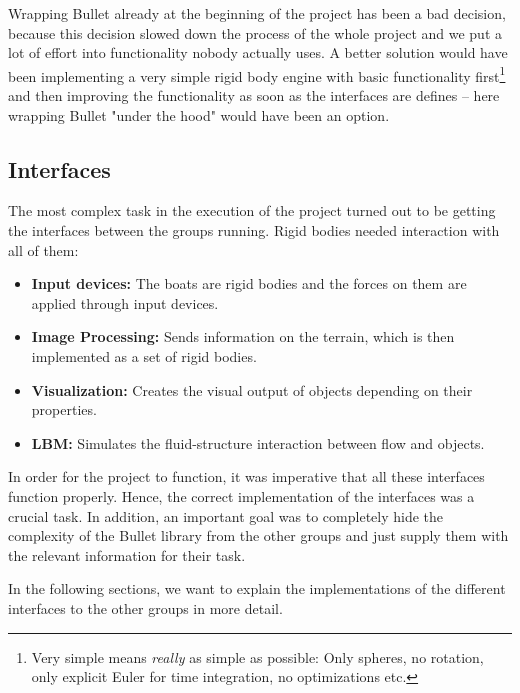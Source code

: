 Wrapping Bullet already at the beginning of the project has been a bad decision, because this decision slowed down the process of the whole project and we put a lot of effort into functionality nobody actually uses. A better solution would have been implementing a very simple rigid body engine with basic functionality first\footnote{Very simple means \emph{really} as simple as possible: Only spheres, no rotation, only explicit Euler for time integration, no optimizations etc.} and then improving the functionality as soon as the interfaces are defines -- here wrapping Bullet "under the hood" would have been an option.

\subsection{Interfaces}
The most complex task in the execution of the project turned out to be getting the interfaces between the groups running. Rigid bodies needed interaction with all of them:
\begin{itemize}
\item \textbf{Input devices:} The boats are rigid bodies and the forces on them are applied through input devices.
\item \textbf{Image Processing:} Sends information on the terrain, which is then implemented as a set of rigid bodies.
\item \textbf{Visualization:} Creates the visual output of objects depending on their properties.
\item \textbf{LBM:} Simulates the fluid-structure interaction between flow and objects.
\end{itemize}
In order for the project to function, it was imperative that all these interfaces function properly. Hence, the correct implementation of the interfaces was a crucial task.
In addition, an important goal was to completely hide the complexity of the Bullet library from the other groups and just supply them with the relevant information for their task.

In the following sections, we want to explain the implementations of the different interfaces to the other groups in more detail.


